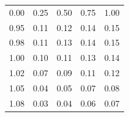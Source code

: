 \begin{tabular}{ccccc}
\hline
0.00 & 0.25 & 0.50 & 0.75 & 1.00 \\
0.95 & 0.11 & 0.12 & 0.14 & 0.15 \\
0.98 & 0.11 & 0.13 & 0.14 & 0.15 \\
1.00 & 0.10 & 0.11 & 0.13 & 0.14 \\
1.02 & 0.07 & 0.09 & 0.11 & 0.12 \\
1.05 & 0.04 & 0.05 & 0.07 & 0.08 \\
1.08 & 0.03 & 0.04 & 0.06 & 0.07 \\
\hline
\end{tabular}
